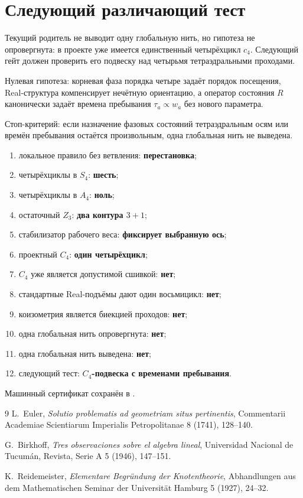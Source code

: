 \section{Следующий различающий тест}

Текущий родитель не выводит одну глобальную нить, но гипотеза не
опровергнута: в проекте уже имеется единственный четырёхцикл $c_4$.
Следующий гейт должен проверить его подвеску над четырьмя
тетраэдральными проходами.

Нулевая гипотеза: корневая фаза порядка четыре задаёт порядок посещения,
Real-структура компенсирует нечётную ориентацию, а оператор состояния $R$
канонически задаёт времена пребывания $\tau_a\propto w_a$ без нового
параметра.

Стоп-критерий: если назначение фазовых состояний тетраэдральным осям или
времён пребывания остаётся произвольным, одна глобальная нить не выведена.

\begin{protocol}
\begin{enumerate}
 \item локальное правило без ветвления: \textbf{перестановка};
 \item четырёхциклы в $S_4$: \textbf{шесть};
 \item четырёхциклы в $A_4$: \textbf{ноль};
 \item остаточный $Z_3$: \textbf{два контура $3+1$};
 \item стабилизатор рабочего веса: \textbf{фиксирует выбранную ось};
 \item проектный $C_4$: \textbf{один четырёхцикл};
 \item $C_4$ уже является допустимой сшивкой: \textbf{нет};
 \item стандартные Real-подъёмы дают один восьмицикл: \textbf{нет};
 \item коизометрия является биекцией проходов: \textbf{нет};
 \item одна глобальная нить опровергнута: \textbf{нет};
 \item одна глобальная нить выведена: \textbf{нет};
 \item следующий тест: \textbf{$C_4$-подвеска с временами пребывания}.
\end{enumerate}
\end{protocol}

Машинный сертификат сохранён в
.

\begin{thebibliography}{9}
L.~Euler,
\emph{Solutio problematis ad geometriam situs pertinentis},
Commentarii Academiae Scientiarum Imperialis Petropolitanae 8 (1741),
128--140.

G.~Birkhoff,
\emph{Tres observaciones sobre el algebra lineal},
Universidad Nacional de Tucum\'an, Revista, Serie A 5 (1946), 147--151.

K.~Reidemeister,
\emph{Elementare Begr\"undung der Knotentheorie},
Abhandlungen aus dem Mathematischen Seminar der Universit\"at Hamburg 5
(1927), 24--32.
\end{thebibliography}